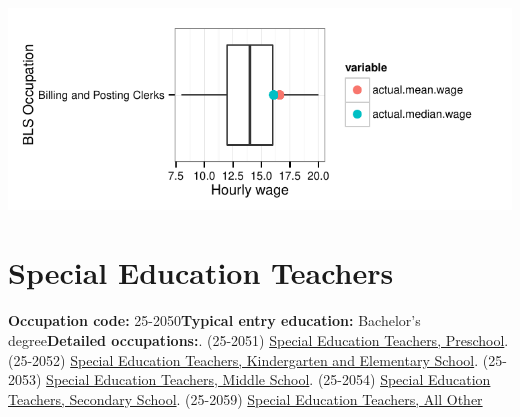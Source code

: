 \documentclass[a4paper,10pt]{article}\usepackage[]{graphicx}\usepackage[]{color}
\makeatletter
\def\maxwidth{ %
  \ifdim\Gin@nat@width>\linewidth
    \linewidth
  \else
    \Gin@nat@width
  \fi
}
\makeatother
\begin{document}
{\centering \includegraphics[width=\maxwidth]{figure/unnamed-chunk-269} 

}


\newpage\section{Special Education Teachers}\textbf{Occupation code:} 25-2050\newline\textbf{Typical entry education:} Bachelor's degree\newline\textbf{Detailed occupations:}. (25-2051)  \href{http://www.bls.gov/oes/current/oes252051.htm}{Special Education Teachers, Preschool}. (25-2052)  \href{http://www.bls.gov/oes/current/oes252052.htm}{Special Education Teachers, Kindergarten and Elementary School}. (25-2053)  \href{http://www.bls.gov/oes/current/oes252053.htm}{Special Education Teachers, Middle School}. (25-2054)  \href{http://www.bls.gov/oes/current/oes252054.htm}{Special Education Teachers, Secondary School}. (25-2059)  \href{http://www.bls.gov/oes/current/oes252059.htm}{Special Education Teachers, All Other}\newline%
\end{document}
